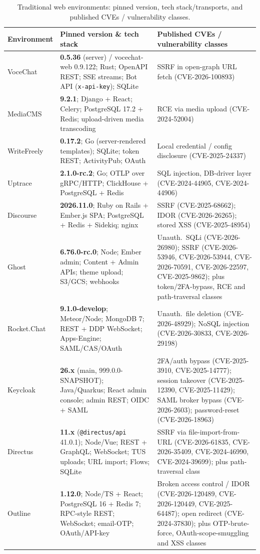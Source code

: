 \documentclass[11pt,a4paper]{article}
\newcommand{\cd}[1]{\lstinline[basicstyle=\ttfamily\small]|#1|}
\begin{document}
\begin{table}[htbp]\centering\footnotesize
\caption{Traditional web environments: pinned version, tech stack/transports, and
published CVEs / vulnerability classes.}\label{tab:envweb}
\begin{tabularx}{\textwidth}{@{}l>{\raggedright\arraybackslash}X>{\raggedright\arraybackslash}X@{}}
\toprule
\textbf{Environment} & \textbf{Pinned version \& tech stack} & \textbf{Published CVEs / vulnerability classes}\\
\midrule
VoceChat    & \textbf{0.5.36} (server) / vocechat-web 0.9.122; Rust; OpenAPI REST; SSE streams; Bot API (\cd{x-api-key}); SQLite & SSRF in open-graph URL fetch (CVE-2026-100893)\\
MediaCMS    & \textbf{9.2.1}; Django + React; Celery; PostgreSQL 17.2 + Redis; upload-driven media transcoding & RCE via media upload (CVE-2024-52004)\\
WriteFreely & \textbf{0.17.2}; Go (server-rendered templates); SQLite; token REST; ActivityPub; OAuth & Local credential / config disclosure (CVE-2025-24337)\\
Uptrace     & \textbf{2.1.0-rc.2}; Go; OTLP over gRPC/HTTP; ClickHouse + PostgreSQL + Redis & SQL injection, DB-driver layer (CVE-2024-44905, CVE-2024-44906)\\
Discourse   & \textbf{2026.11.0}; Ruby on Rails + Ember.js SPA; PostgreSQL + Redis + Sidekiq; nginx & SSRF (CVE-2025-68662); IDOR (CVE-2026-26265); stored XSS (CVE-2025-48954)\\
Ghost       & \textbf{6.76.0-rc.0}; Node; Ember admin; Content + Admin APIs; theme upload; S3/GCS; webhooks & Unauth.\ SQLi (CVE-2026-26980); SSRF (CVE-2026-53946, CVE-2026-53944, CVE-2026-70591, CVE-2026-22597, CVE-2025-9862); plus token/2FA-bypass, RCE and path-traversal classes\\
Rocket.Chat & \textbf{9.1.0-develop}; Meteor/Node; MongoDB 7; REST + DDP WebSocket; Apps-Engine; SAML/CAS/OAuth & Unauth.\ file deletion (CVE-2026-48929); NoSQL injection (CVE-2026-30833, CVE-2026-29198)\\
Keycloak    & \textbf{26.x} (main, 999.0.0-SNAPSHOT); Java/Quarkus; React admin console; admin REST; OIDC + SAML & 2FA/auth bypass (CVE-2025-3910, CVE-2025-14777); session takeover (CVE-2025-12390, CVE-2025-11429); SAML broker bypass (CVE-2026-2603); password-reset (CVE-2026-18963)\\
Directus    & \textbf{11.x} (\cd{@directus/api} 41.0.1); Node/Vue; REST + GraphQL; WebSocket; TUS uploads; URL import; Flows; SQLite & SSRF via file-import-from-URL (CVE-2026-61835, CVE-2026-35409, CVE-2024-46990, CVE-2024-39699); plus path-traversal class\\
Outline     & \textbf{1.12.0}; Node/TS + React; PostgreSQL 16 + Redis 7; RPC-style REST; WebSocket; email-OTP; OAuth/API-key & Broken access control / IDOR (CVE-2026-120489, CVE-2026-120449, CVE-2025-64487); open redirect (CVE-2024-37830); plus OTP-brute-force, OAuth-scope-smuggling and XSS classes\\
\bottomrule
\end{tabularx}


\end{table}
\end{document}
